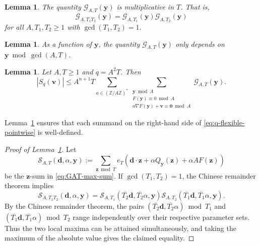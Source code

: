 \documentclass[a4paper,11pt, twoside,reqno]{amsart}
\theoremstyle{plain}
\newtheorem{lemma}[thm]{Lemma}
\theoremstyle{definition}
\theoremstyle{remark}
\newcommand{\F}{\mathbb{F}}
\newcommand{\bfv}{\bm{v}}
\newcommand{\bfy}{\bm{y}}
\newcommand{\bfz}{\bm{z}}
\newcommand{\bfd}{\bm{d}}
\newcommand{\ZZ}{\mathbb{Z}}
\renewcommand{\bar}{\overline}
\renewcommand{\le}{\leqslant}
\renewcommand{\ge}{\geqslant}
\numberwithin{equation}{section}
\begin{document}
\begin{lemma}
\label{LEM:max-G-multiplicative}
The quantity $\mathcal G_{A,T}(\bfy)$ is multiplicative in $T$.
That is,
\begin{equation}
\label{EQ:max-G-multiplicative}
\mathcal G_{A,T_1T_2}(\bfy)
= \mathcal G_{A,T_1}(\bfy)
\mathcal G_{A,T_2}(\bfy)
\end{equation}
for all $A,T_1,T_2\ge 1$ with $\gcd(T_1,T_2)=1$.
\end{lemma}

\begin{lemma}
\label{LEM:max-G-A-invariant}
As a function of $\bfy$,
the quantity $\mathcal G_{A,T}(\bfy)$
only depends on $\bfy \bmod{\gcd(A,T)}$.
\end{lemma}

\begin{lemma}
\label{lem:q-flexible-lifting}
Let $A,T\ge 1$ and $q = A^2T$.
Then
\begin{equation}
\label{eq:q-flexible-pointwise}
|S_q(\bfv)|
\le A^{n+1} T
\sum_{a\in (\ZZ/A\ZZ)^\ast}
\sum_{\substack{\bfy\bmod A\\F(\bfy)\equiv0\bmod A
\\ a\nabla F(\bfy)+\bfv\equiv \bm0\bmod A}} \mathcal G_{A,T}(\bfy).
\end{equation}
\end{lemma}

Lemma~\ref{LEM:max-G-A-invariant} ensures that each summand on the right-hand side of
\eqref{eq:q-flexible-pointwise} is well-defined.

\begin{proof}
[Proof of Lemma~\ref{LEM:max-G-multiplicative}]
Let
\begin{equation}
\label{z-sum-in-max-G}
\mathcal{S}_{A,T}(\bfd,\alpha,\bfy)
:= \sum_{\bfz\bmod T} e_T(\bfd\cdot\bfz+\alpha Q_{\bfy}(\bfz)+\alpha A F(\bfz))
\end{equation}
be the $\bfz$-sum in \eqref{eq:GAT-max-sum}.
If $\gcd(T_1,T_2)=1$,
the Chinese remainder theorem implies
\begin{equation*}
\mathcal{S}_{A,T_1T_2}(\bfd,\alpha,\bfy)
= \mathcal{S}_{A,T_1}(\bar{T_2}\bfd,\bar{T_2}\alpha,\bfy)
\mathcal{S}_{A,T_2}(\bar{T_1}\bfd,\bar{T_1}\alpha,\bfy).
\end{equation*}
By the Chinese remainder theorem, the pairs
$(\bar{T_2}\bfd,\bar{T_2}\alpha)\bmod T_1$
and
$(\bar{T_1}\bfd,\bar{T_1}\alpha)\bmod T_2$
range independently over their respective parameter sets.
Thus the two local maxima can be attained simultaneously,
and taking the maximum of the absolute value gives the
claimed equality.
\end{proof}
\end{document}
